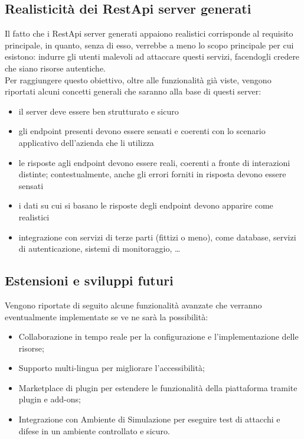 \subsection{Realisticità dei RestApi server generati}
Il fatto che i RestApi server generati appaiono realistici corrisponde al requisito principale, in quanto, senza di esso, verrebbe a meno lo scopo principale per cui esistono: indurre gli utenti malevoli ad attaccare questi servizi, facendogli credere che siano risorse autentiche.\\
Per raggiungere questo obiettivo, oltre alle funzionalità già viste, vengono riportati alcuni concetti generali che saranno alla base di questi server:
\begin{itemize}
    \item il server deve essere ben strutturato e sicuro
    \item gli endpoint presenti devono essere sensati e coerenti con lo scenario applicativo dell'azienda che li utilizza
    \item le risposte agli endpoint devono essere reali, coerenti a fronte di interazioni distinte; contestualmente, anche gli errori forniti in risposta devono essere sensati
    \item i dati su cui si basano le risposte degli endpoint devono apparire come realistici
    \item integrazione con servizi di terze parti (fittizi o meno), come database, servizi di autenticazione, sistemi di monitoraggio, \dots
\end{itemize}


\subsection{Estensioni e sviluppi futuri}
Vengono riportate di seguito alcune funzionalità avanzate che verranno eventualmente implementate se ve ne sarà la possibilità:
\begin{itemize}
    \item Collaborazione in tempo reale per la configurazione e l'implementazione delle risorse;
    \item Supporto multi-lingua per migliorare l'accessibilità;
    \item Marketplace di plugin per estendere le funzionalità della piattaforma tramite plugin e add-ons;
    \item Integrazione con Ambiente di Simulazione per eseguire test di attacchi e difese in un ambiente controllato e sicuro.
\end{itemize}

